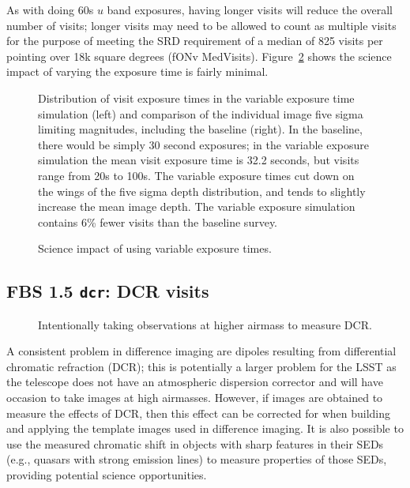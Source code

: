 As with doing 60s $u$ band exposures, having longer visits will reduce the overall number of visits; longer visits may need to be allowed to count as multiple visits for the purpose of meeting the SRD requirement of a median of 825 visits per pointing over 18k square degrees (fONv MedVisits). Figure~\ref{fig:var_radar} shows the science impact of varying the exposure time is fairly minimal. 

\begin{figure}
\caption{Distribution of visit exposure times in the variable exposure time simulation (left) and comparison of the individual image five sigma limiting magnitudes, including the baseline (right).  In the baseline, there would be simply 30 second exposures; in the variable exposure simulation the mean visit exposure time is 32.2 seconds, but visits range from 20s to 100s. The variable exposure times cut down on the wings of the five sigma depth distribution, and tends to slightly increase the mean image depth. The variable exposure simulation contains 6\% fewer visits than the baseline survey.}
\label{fig:varexpt_exptime}
\end{figure}

\begin{figure}
\caption{Science impact of using variable exposure times.}\label{fig:var_radar}
\end{figure}


\subsection{FBS 1.5 {\tt dcr}: DCR visits}

\begin{figure}
\caption{Intentionally taking observations at higher airmass to measure DCR.}
\end{figure}

A consistent problem in difference imaging are dipoles resulting from differential chromatic refraction (DCR); this is potentially a larger problem for the LSST as the telescope does not have an atmospheric dispersion corrector and will have occasion to take images at high airmasses. However, if images are obtained to measure the effects of DCR, then this effect can be corrected for when building and applying the template images used in difference imaging. It is also possible to use the measured chromatic shift in objects with sharp features in their SEDs (e.g., quasars with strong emission lines) to measure properties of those SEDs, providing potential science opportunities. 

